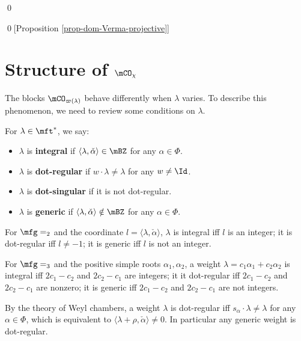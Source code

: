 	\qed

	\qed[Proposition \ref{prop-dom-Verma-projective}]

	\section{Structure of \texorpdfstring{$\mCO_\chi$}{Ochi}}

	The blocks $\mCO_{\varpi(\lambda)}$ behave differently when $\lambda$ varies. To describe this phenomenon, we need to review some conditions on $\lambda$.

	\begin{defn}
		\label{defn-integral-weight}
		For $\lambda \in \mft^*$, we say:
		\begin{itemize}
			\item 
				$\lambda$ is \textbf{integral} if $\langle \lambda,\check\alpha \rangle \in \mBZ$ for any $\alpha\in \Phi$.
			\item 
				$\lambda$ is \textbf{dot-regular} if $w\cdot \lambda \neq \lambda$ for any $w\neq \Id$.
			\item
				$\lambda$ is \textbf{dot-singular} if it is not dot-regular.
			\item
				$\lambda$ is \textbf{generic} if $\langle \lambda,\check\alpha \rangle \notin \mBZ$ for any $\alpha\in \Phi$.
		\end{itemize}
	\end{defn}

	\begin{exam}
		For $\mfg=\sl_2$ and the coordinate $l=\langle \lambda,\check\alpha\rangle$, $\lambda$ is integral iff $l$ is an integer; it is dot-regular iff $l\neq -1$; it is generic iff $l$ is not an integer.
	\end{exam}

	\begin{exam}
		For $\mfg=\sl_3$ and the positive simple roots $\alpha_1,\alpha_2$, a weight $\lambda= c_1\alpha_1+c_2\alpha_2$ is integral iff $2c_1-c_2$ and $2c_2-c_1$ are integers; it it dot-regular iff $2c_1-c_2$ and $2c_2-c_1$ are nonzero; it is generic iff $2c_1-c_2$ and $2c_2-c_1$ are not integers.
	\end{exam}

	\begin{rem}
		By the theory of Weyl chambers, a weight $\lambda$ is dot-regular iff $s_\alpha\cdot \lambda \neq \lambda$ for any $\alpha\in \Phi$, which is equivalent to $\langle \lambda+\rho,\check\alpha \rangle \neq 0$. In particular any generic weight is dot-regular.
	\end{rem}

